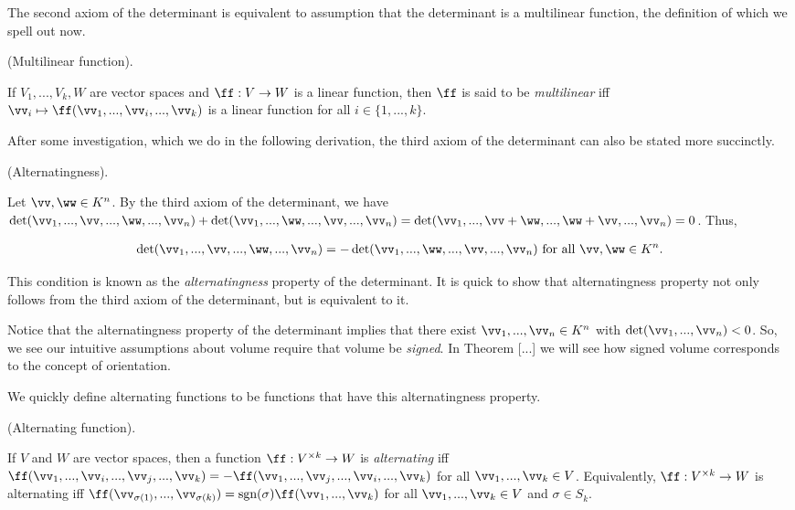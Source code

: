 The second axiom of the determinant is equivalent to assumption that the determinant is a multilinear function, the definition of which we spell out now.

\begin{defn}
    (Multilinear function).

    If $V_1, ..., V_k, W$ are vector spaces and $\ff:V \rightarrow W$ is a linear function, then $\ff$ is said to be \textit{multilinear} iff $\vv_i \mapsto \ff(\vv_1, ..., \vv_i, ..., \vv_k)$ is a linear function for all $i \in \{1, ..., k\}$.
\end{defn}

After some investigation, which we do in the following derivation, the third axiom of the determinant can also be stated more succinctly.

\begin{deriv}
    (Alternatingness).

    Let $\vv, \ww \in K^n$. By the third axiom of the determinant, we have $\det(\vv_1, ..., \vv, ..., \ww, ..., \vv_n) + \det(\vv_1, ..., \ww, ..., \vv, ..., \vv_n) = \det(\vv_1, ..., \vv + \ww, ..., \ww + \vv, ..., \vv_n) = 0$. Thus,

    \begin{align*}
        \det(\vv_1, ..., \vv, ..., \ww, ..., \vv_n) = -\det(\vv_1, ..., \ww, ..., \vv, ..., \vv_n) \text{ for all $\vv, \ww \in K^n$}.
    \end{align*}

    This condition is known as the \textit{alternatingness} property of the determinant. It is quick to show that alternatingness property not only follows from the third axiom of the determinant, but is equivalent to it.

    Notice that the alternatingness property of the determinant implies that there exist $\vv_1, ..., \vv_n \in K^n$ with $\det(\vv_1, ..., \vv_n) < 0$. So, we see our intuitive assumptions about volume require that volume be \textit{signed}. In Theorem [...] we will see how signed volume corresponds to the concept of orientation.
\end{deriv}

We quickly define alternating functions to be functions that have this alternatingness property.

\begin{defn}
    (Alternating function).

    If $V$ and $W$ are vector spaces, then a function $\ff:V^{\times k} \rightarrow W$ is \textit{alternating} iff \\ ${\ff(\vv_1, ..., \vv_i, ..., \vv_j, ..., \vv_k) = -\ff(\vv_1, ..., \vv_j, ..., \vv_i, ..., \vv_k)}$ for all $\vv_1, ..., \vv_k \in V$. Equivalently, $\ff:V^{\times k} \rightarrow W$ is alternating iff
    ${\ff(\vv_{\sigma(1)}, ..., \vv_{\sigma(k)}) = \sgn(\sigma) \ff(\vv_1, ..., \vv_k)}$ for all $\vv_1, ..., \vv_k \in V$ and $\sigma \in S_k$.
\end{defn}

